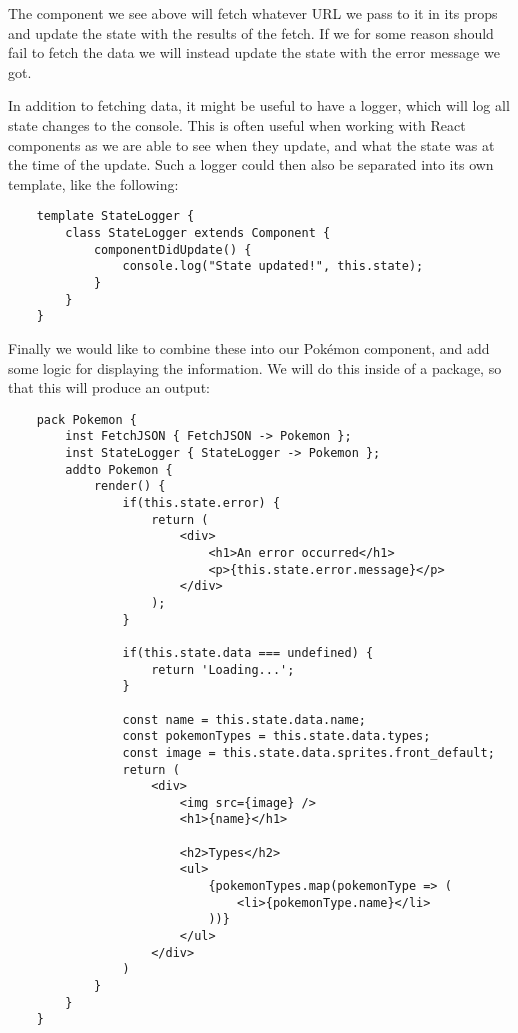 The component we see above will fetch whatever URL we pass to it in its props and update the state with the results of the fetch.
If we for some reason should fail to fetch the data we will instead update the state with the error message we got.

In addition to fetching data, it might be useful to have a logger, which will log all state changes to the console.
This is often useful when working with React components as we are able to see when they update, and what the state was at the time of the update.
Such a logger could then also be separated into its own template, like the following:

\begin{verbatim}
    template StateLogger {
        class StateLogger extends Component {
            componentDidUpdate() {
                console.log("State updated!", this.state);
            }
        }
    }
\end{verbatim}

Finally we would like to combine these into our Pokémon component, and add some logic for displaying the information.
We will do this inside of a package, so that this will produce an output:

\begin{verbatim}
    pack Pokemon {
        inst FetchJSON { FetchJSON -> Pokemon };
        inst StateLogger { StateLogger -> Pokemon };
        addto Pokemon {
            render() {
                if(this.state.error) {
                    return (
                        <div>
                            <h1>An error occurred</h1>
                            <p>{this.state.error.message}</p>
                        </div>
                    );
                }

                if(this.state.data === undefined) {
                    return 'Loading...';
                }

                const name = this.state.data.name;
                const pokemonTypes = this.state.data.types;
                const image = this.state.data.sprites.front_default;
                return (
                    <div>
                        <img src={image} />
                        <h1>{name}</h1>

                        <h2>Types</h2>
                        <ul>
                            {pokemonTypes.map(pokemonType => (
                                <li>{pokemonType.name}</li>
                            ))}
                        </ul>
                    </div>
                )
            }
        }
    }
\end{verbatim}

